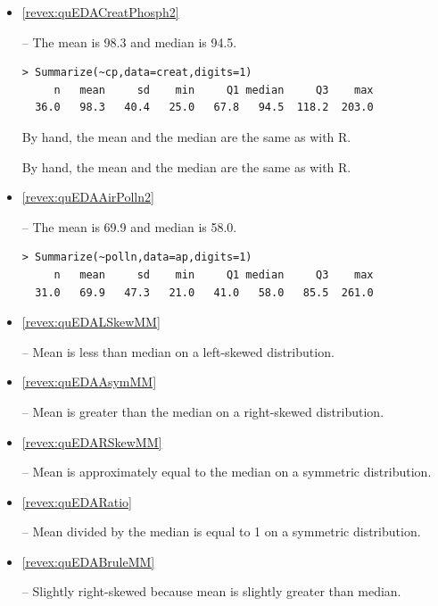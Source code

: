 \documentclass[10pt,openany]{book}\usepackage[]{graphicx}\usepackage[]{color}
\makeatletter
\newenvironment{kframe}{%
 \def\at@end@of@kframe{}%
 \ifinner\ifhmode%
  \def\at@end@of@kframe{\end{minipage}}%
  \begin{minipage}{\columnwidth}%
 \fi\fi%
 \def\FrameCommand##1{\hskip\@totalleftmargin \hskip-\fboxsep
 \colorbox{shadecolor}{##1}\hskip-\fboxsep
     \hskip-\linewidth \hskip-\@totalleftmargin \hskip\columnwidth}%
 \MakeFramed {\advance\hsize-\width
   \@totalleftmargin\z@ \linewidth\hsize
   \@setminipage}}%
 {\par\unskip\endMakeFramed%
 \at@end@of@kframe}
\newenvironment{knitrout}{}{} %
\makeatother
\begin{document}
\begin{itemize}
  \item \hypertarget{ans:quEDACreatPhosph2}{\ref{revex:quEDACreatPhosph2}} -- The mean is 98.3 and median is 94.5.
\begin{knitrout}
\color{fgcolor}\begin{kframe}
\begin{verbatim}
> Summarize(~cp,data=creat,digits=1)
     n   mean     sd    min     Q1 median     Q3    max 
  36.0   98.3   40.4   25.0   67.8   94.5  118.2  203.0 
\end{verbatim}
\end{kframe}
\end{knitrout}
\noindent By hand, the mean and the median are the same as with R.


\noindent By hand, the mean and the median are the same as with R.
  \item \hypertarget{ans:quEDAAirPolln2}{\ref{revex:quEDAAirPolln2}} -- The mean is 69.9 and median is 58.0.
\begin{knitrout}
\color{fgcolor}\begin{kframe}
\begin{verbatim}
> Summarize(~polln,data=ap,digits=1)
     n   mean     sd    min     Q1 median     Q3    max 
  31.0   69.9   47.3   21.0   41.0   58.0   85.5  261.0 
\end{verbatim}
\end{kframe}
\end{knitrout}

  \item \hypertarget{ans:quEDALSkewMM}{\ref{revex:quEDALSkewMM}} --  Mean is less than median on a left-skewed distribution.

  \item \hypertarget{ans:quEDAAsymMM}{\ref{revex:quEDAAsymMM}} --  Mean is greater than the median on a right-skewed distribution.

  \item \hypertarget{ans:quEDARSkewMM}{\ref{revex:quEDARSkewMM}} --  Mean is approximately equal to the median on a symmetric distribution.

  \item \hypertarget{ans:quEDARatio}{\ref{revex:quEDARatio}} --  Mean divided by the median is equal to 1 on a symmetric distribution.

  \item \hypertarget{ans:quEDABruleMM}{\ref{revex:quEDABruleMM}} --  Slightly right-skewed because mean is slightly greater than median.


\end{itemize}
\end{document}
